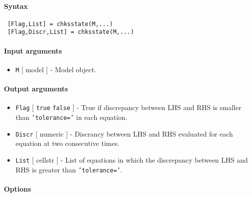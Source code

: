 


	\paragraph{Syntax}
 
 \begin{verbatim}
 [Flag,List] = chksstate(M,...)
 [Flag,Discr,List] = chksstate(M,...)
 \end{verbatim}
 
 \paragraph{Input arguments}
 
 \begin{itemize}
 \item
   \texttt{M} {[} model {]} - Model object.
 \end{itemize}
 
 \paragraph{Output arguments}
 
 \begin{itemize}
 \item
   \texttt{Flag} {[} \texttt{true} \textbar{} \texttt{false} {]} - True
   if discrepancy between LHS and RHS is smaller than
   \texttt{'tolerance='} in each equation.
 \item
   \texttt{Discr} {[} numeric {]} - Discrancy between LHS and RHS
   evaluated for each equation at two consecutive times.
 \item
   \texttt{List} {[} cellstr {]} - List of equations in which the
   discrepancy between LHS and RHS is greater than \texttt{'tolerance='}.
 \end{itemize}
 
 \paragraph{Options}
 
